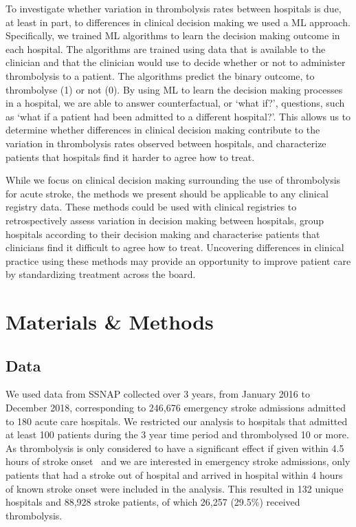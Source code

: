 \documentclass[12pt,a4paper, pdftex]{elsarticle}
\begin{document}
To investigate whether variation in thrombolysis rates between hospitals is due, at least in part, to differences in clinical decision making we used a ML approach. Specifically, we trained ML algorithms to learn the decision making outcome in each hospital. The algorithms are trained using data that is available to the clinician and that the clinician would use to decide whether or not to administer thrombolysis to a patient. The algorithms predict the binary outcome, to thrombolyse (1) or not (0). By using ML to learn the decision making processes in a hospital, we are able to answer counterfactual, or `what if?', questions, such as `what if a patient had been admitted to a different hospital?'. This allows us to determine whether differences in clinical decision making contribute to the variation in thrombolysis rates observed between hospitals, and characterize patients that hospitals find it harder to agree how to treat.

While we focus on clinical decision making surrounding the use of thrombolysis for acute stroke, the methods we present should be applicable to any clinical registry data. These methods could be used with clinical registries to retrospectively assess variation in decision making between hospitals, group hospitals according to their decision making and characterise patients that clinicians find it difficult to agree how to treat. Uncovering differences in clinical practice using these methods may provide an opportunity to improve patient care by standardizing treatment across the board.

\section{Materials \& Methods}

\subsection{Data}

We used data from SSNAP collected over 3 years, from January 2016 to December 2018, corresponding to 246,676 emergency stroke admissions admitted to 180 acute care hospitals. We restricted our analysis to hospitals that admitted at least 100 patients during the 3 year time period and thrombolysed 10 or more. As thrombolysis is only considered to have a significant effect if given within 4.5 hours of stroke onset~\cite{emberson2014effect} and we are interested in emergency stroke admissions, only patients that had a stroke out of hospital and arrived in hospital within 4 hours of known stroke onset were included in the analysis. This resulted in 132 unique hospitals and 88,928 stroke patients, of which 26,257 (29.5\%) received thrombolysis. 
\end{document}
